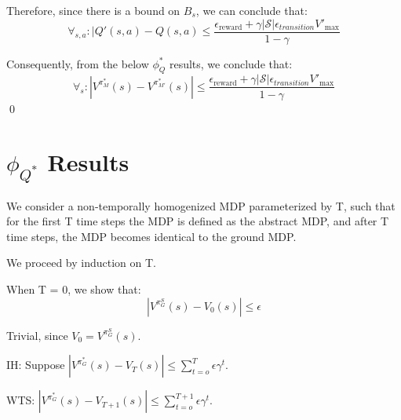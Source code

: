 \documentclass[11pt]{amsart}
\begin{document}
Therefore, since there is a bound on $B_s$, we can conclude that:
\begin{equation}
\forall_{s,a} : |Q'(s,a) - Q(s,a) \leq \frac{{\epsilon_{\text{reward}}} + \gamma |\mathcal{S}|\epsilon_{transition}V'_{\text{max}}}{1-\gamma}
\end{equation}

Consequently, from the below $\phi_Q^*$ results, we conclude that:
\begin{equation}
\forall_s : |V^{\pi^*_M}(s) - V^{\pi^*_{M'}}(s)| \leq \frac{{\epsilon_{\text{reward}}} + \gamma |\mathcal{S}|\epsilon_{transition}V'_{\text{max}}}{1-\gamma}
\end{equation}
\qed


\newpage
\section{$\phi_{Q^*}$ Results}

We consider a non-temporally homogenized MDP parameterized by T, such that for the first T time steps the MDP is defined as the abstract MDP, and after T time steps, the MDP becomes identical to the ground MDP.

We proceed by induction on T.


When T = 0, we show that:
\begin{equation}
|V^{\pi_G^S}(s) - V_0(s)| \leq \epsilon
\end{equation}

Trivial, since $V_0 = V^{\pi_G^S}(s)$.


IH: Suppose $|V^{\pi_G^*}(s) - V_T(s)| \leq \sum_{t=o}^T \epsilon \gamma^t$.

WTS: $|V^{\pi_G^*}(s) - V_{T+1}(s)| \leq \sum_{t=o}^{T+1} \epsilon \gamma^t$.
\end{document}
